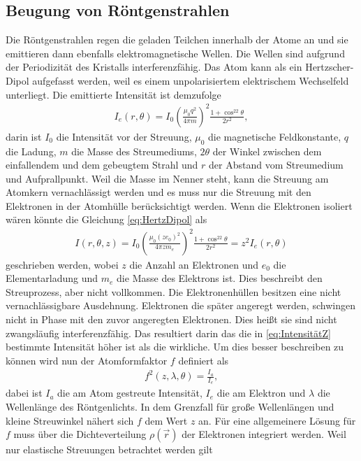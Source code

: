 \subsection{Beugung von Röntgenstrahlen}
Die Röntgenstrahlen regen die geladen Teilchen innerhalb der Atome an und sie emittieren dann ebenfalls elektromagnetische Wellen. Die Wellen sind aufgrund der Periodizität des Kristalls interferenzfähig. Das Atom kann als ein Hertzscher-Dipol aufgefasst werden, weil es einem unpolarisiertem elektrischem Wechselfeld unterliegt. Die emittierte Intensität ist demzufolge
\begin{align}
	I_e(r,\theta)=I_0\left(\frac{\mu_0q^2}{4\pi m}\right)^2\frac{1+\cos^22\theta}{2r^2} \label{eq:HertzDipol},
\end{align}
darin ist $I_0$ die Intensität vor der Streuung, $\mu_0$ die magnetische Feldkonstante, $q$ die Ladung, $m$ die Masse des Streumediums, $2\theta$ der Winkel zwischen dem einfallendem und dem gebeugtem Strahl und $r$ der Abstand vom Streumedium und Aufprallpunkt.
Weil die Masse im Nenner steht, kann die Streuung am Atomkern vernachlässigt werden und es muss nur die Streuung mit den Elektronen in der Atomhülle berücksichtigt werden. Wenn die Elektronen isoliert wären könnte die Gleichung \eqref{eq:HertzDipol} als
\begin{align}
	I\left(r,\theta,z\right)=I_0\left(\frac{\mu_0(ze_0)^2}{4\pi zm_e}\right)^2\frac{1+\cos^22\theta}{2r^2}=z^2I_e\left(r,\theta\right)\label{eq:IntensitätZ}
\end{align}
geschrieben werden, wobei $z$ die Anzahl an Elektronen und $e_0$ die Elementarladung und $m_e$ die Masse des Elektrons ist. Dies beschreibt den Streuprozess, aber nicht vollkommen. Die Elektronenhüllen besitzen eine nicht vernachlässigbare Ausdehnung. Elektronen die später angeregt werden, schwingen nicht in Phase mit den zuvor angeregten Elektronen. Dies heißt sie sind nicht zwangsläufig interferenzfähig. Das resultiert darin das die in \eqref{eq:IntensitätZ} bestimmte Intensität höher ist als die wirkliche. Um dies besser beschreiben zu können wird nun der Atomformfaktor $f$ definiert als
\begin{align}
	f^2\left(z,\lambda,\theta\right)=\frac{I_a}{I_e},
\end{align}
dabei ist $I_a$ die am Atom gestreute Intensität, $I_e$ die am Elektron und $\lambda$ die Wellenlänge des Röntgenlichts. In dem Grenzfall für große Wellenlängen und kleine Streuwinkel nähert sich $f$ dem Wert $z$ an. Für eine allgemeinere Lösung für $f$ muss über die Dichteverteilung $\rho (\vec{r})$ der Elektronen integriert werden. Weil nur elastische Streuungen betrachtet werden gilt 
